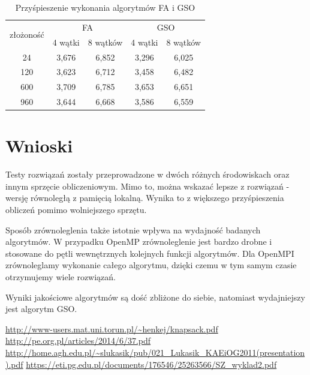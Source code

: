 \documentclass[11pt,a4paper,twoside]{article}
\begin{document}
\bgroup
\def\arraystretch{1.1}
\begin{table}[ht]
\caption{Przyśpieszenie wykonania algorytmów FA i GSO}
\label{MPIprzysp}
\centering
\begin{tabular}{|c||c|c||c|c|}
\hline
 \multirow{2}{*}{złożoność} & \multicolumn{2}{c||}{FA} & \multicolumn{2}{c|}{GSO} \\\cline{2-5}
 & 4 wątki & 8 wątków & 4 wątki & 8 wątków \\\hline
 24 & 3,676 & 6,852 & 3,296 & 6,025\\\hline
 120 & 3,623 & 6,712 & 3,458 & 6,482 \\\hline
 600 & 3,709 & 6,785 & 3,653 & 6,651 \\\hline
 960 & 3,644 & 6,668 & 3,586 & 6,559 \\\hline
\end{tabular}
\end{table}
\egroup
\vspace*{1\baselineskip}

\section{Wnioski}
Testy rozwiązań zostały przeprowadzone w dwóch różnych środowiskach oraz innym sprzęcie obliczeniowym. Mimo to, można wskazać lepsze z  rozwiązań - wersję równoległą z pamięcią lokalną. Wynika to z większego przyśpieszenia obliczeń pomimo wolniejszego sprzętu. 

Sposób zrównoleglenia także istotnie wpływa na wydajność badanych algorytmów. W przypadku OpenMP zrównoleglenie jest bardzo drobne i stosowane do pętli wewnętrznych kolejnych funkcji algorytmów. Dla OpenMPI zrównoleglamy wykonanie całego algorytmu, dzięki czemu w tym samym czasie otrzymujemy wiele rozwiązań. 

Wyniki jakościowe algorytmów są dość zbliżone do siebie, natomiast wydajniejszy jest algorytm GSO.


\begin{thebibliography}{9}
\url{http://www-users.mat.uni.torun.pl/~henkej/knapsack.pdf}
\url{http://pe.org.pl/articles/2014/6/37.pdf}
\url{http://home.agh.edu.pl/~slukasik/pub/021_Lukasik_KAEiOG2011(presentation).pdf}
\url{https://eti.pg.edu.pl/documents/176546/25263566/SZ_wyklad2.pdf}

\end{thebibliography}
\end{document}
